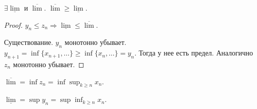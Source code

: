 \begin{theorem}
    $\exists \underline{\lim}$ и $\overline{\lim}$.  $\overline{\lim} \ge \underline{\lim}$.
\end{theorem}
\begin{proof}
    $y_n \le z_n \Rightarrow \underline{\lim} \le \overline{\lim}$.

    Существование. $y_n$ монотонно убывает.  $y_{n+1} = \inf \{x_{n+1},\ldots\} \ge \inf\{x_n,\ldots\} = y_n$. Тогда у нее есть предел. Аналогично $z_n$ монотонно убывает.
\end{proof}
\begin{remark}
    $\overline{\lim} = \inf z_n = \inf \sup_{k \ge n} x_n$.

    $\underline{\lim} = \sup y_n = \sup \inf_{k \ge n} x_n$.
\end{remark}

